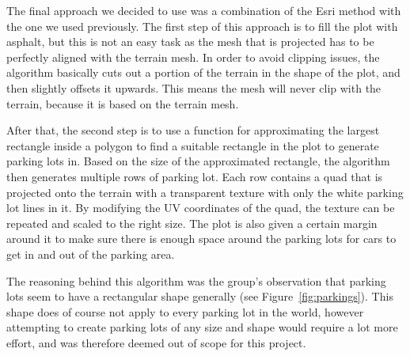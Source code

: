 The final approach we decided to use was a combination of the Esri method with the one we used previously.
The first step of this approach is to fill the plot with asphalt, but this is not an easy task as the mesh that is projected has to be perfectly aligned with the terrain mesh.
In order to avoid clipping issues, the algorithm basically cuts out a portion of the terrain in the shape of the plot, and then slightly offsets it upwards.
This means the mesh will never clip with the terrain, because it is based on the terrain mesh.

After that, the second step is to use a function for approximating the largest rectangle inside a polygon to find a suitable rectangle in the plot to generate parking lots in.
Based on the size of the approximated rectangle, the algorithm then generates multiple rows of parking lot.
Each row contains a quad that is projected onto the terrain with a transparent texture with only the white parking lot lines in it.
By modifying the UV coordinates of the quad, the texture can be repeated and scaled to the right size.
The plot is also given a certain margin around it to make sure there is enough space around the parking lots for cars to get in and out of the parking area.

The reasoning behind this algorithm was the group's observation that parking lots seem to have a rectangular shape generally (see Figure~\ref{fig:parkings}).
This shape does of course not apply to every parking lot in the world, however attempting to create parking lots of any size and shape would require a lot more effort, and was therefore deemed out of scope for this project. 

